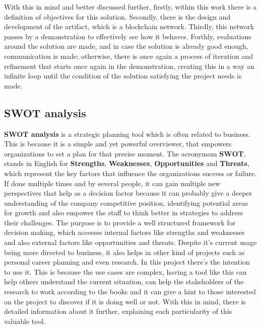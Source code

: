 With this in mind and better discussed further, firstly, within this work there is a definition of objectives for this solution. Secondly, there is the design and development of the artifact, which is a blockchain network. Thirdly, this network passes by a demonstration to effectively see how it behaves. Forthly, evaluations around the solution are made, and in case the solution is already good enough, communication is made; otherwise, there is once again a process of iteration and refinement that starts once again in the demonstration, creating this in a way an infinite loop until the condition of the solution satisfying the project needs is made.

%
%
%
%
\subsection{SWOT analysis}
\textbf{SWOT analysis} is a strategic planning tool which is often related to business. This is because it is a simple and yet powerful overviewer, that empowers organizations to set a plan for that precise moment. The acronymom \textbf{SWOT}, stands in English for \textbf{Strengths}, \textbf{Weaknesses}, \textbf{Opportunities} and \textbf{Threats}, which represent the key factors that influence the organizations success or failure. If done multiple times and by several people, it can gain multiple new perspectives that help as a decision factor because it can probably give a deeper understanding of the company competitive position, identifying potential areas for growth and also empower the staff to think better in strategies to address their challenges.
The purpose is to provide a well structured framework for decision making, which accesses internal factors like strengths and weaknesses and also external factors like opportunities and threats.
Despite it's current usage being more directed to business, it also helps in other kind of projects such as personal career planning and even research. In this project there's the intention to use it. This is because the use cases are complex, having a tool like this can help others understand the current situation, can help the stakeholders of the research to work according to the books and it can give a hint to those interested on the project to discover if it is doing well or not. 
With this in mind, there is detailed information about it further, explaining each particularity of this valuable tool.
